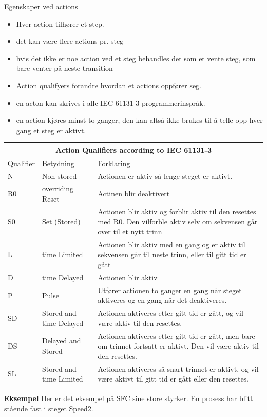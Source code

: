 Egenskaper ved actions
\begin{itemize}
\item Hver action tilhører et step. 
\item det kan være flere actions pr. steg
\item hvis det ikke er noe action ved et steg behandles det som et vente
steg, som bare venter på neste transition
\item Action qualifyers forandre hvordan et actions oppfører seg. 
\item en acton kan skrives i alle IEC 61131-3 programmerinspråk. 
\item en action kjøres minst to ganger, den kan altså ikke brukes til å telle opp hver gang et steg er aktivt. 
\end{itemize}
\begin{table}
\begin{center}
\begin{tabular}{ | m{1.5cm} | m{3cm}| m{10cm} | } 
\hline
\multicolumn{3}{|c|}{Action Qualifiers according to IEC 61131-3} \\
\hline
	Qualifier	& Betydning & Forklaring \\ 
	\hline
	N	&Non-stored	&Actionen er aktiv så lenge steget er aktivt. \\
	\hline
	R0	&overriding Reset	&Actinen blir deaktivert\\
	\hline
	S0	&Set (Stored)	& Actionen blir aktiv og forblir aktiv til den resettes med R0. Den vilforble aktiv selv om sekvensen går over til et nytt trinn\\
	\hline
	L	&time Limited	&Actionen blir aktiv med en gang og er aktiv til sekvensen går til neste trinn, eller til gitt tid er gått\\
	\hline
	D	&time Delayed	&Actionen blir aktiv \\
	\hline
	P	&Pulse	&Utfører actionen to ganger en gang når steget aktiveres og en gang når det deaktiveres.\\
	\hline
	SD	&Stored and time Delayed	&Actionen aktiveres etter gitt tid er gått, og vil være aktiv til den resettes.\\
	\hline
	DS	&Delayed and Stored	&Actionen aktiveres etter gitt tid er gått, men bare om trinnet fortsatt er aktivt. Den vil være aktiv til den resettes.\\
	\hline
	SL	&Stored and time Limited	&Actionen aktiveres så snart trinnet er aktivt, og vil være aktivt til gitt tid er gått eller den resettes. \\
	\hline
\end{tabular}
\end{center}
\end{table}
\vfill\eject
\textbf{Eksempel}
\vskip 2.5pt 
Her er det eksempel på SFC sine store styrker. En prosess har blitt stående fast i steget Speed2. \\

